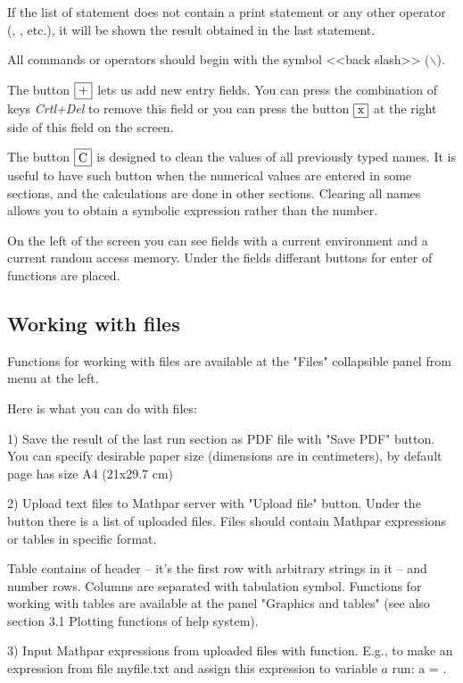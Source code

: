 If the list of statement does not contain a print statement  or any other operator (, , etc.),  it will be shown the result obtained in the last statement.
  
All commands or operators should begin with the symbol <<back slash>> ($\backslash$).  
 
 
The button $\fbox{+}$ lets us add new entry fields. You can press the combination of
 keys {\it Crtl+Del} to remove this field or you can press the button $\fbox{x}$ at the right side of this field on the screen.
 
The button $\fbox{C}$ is designed to clean the values of all previously typed names. 
It is useful to have such button when the numerical values are entered in some sections, and the calculations are done in other sections. 
Clearing all names allows you to obtain a symbolic expression rather than the number.

On the left of the screen you can see fields with a current environment and a current random access memory. Under the fields differant buttons for enter of functions are placed.


\subsection{Working with files}
Functions for working with files are available at the "Files" collapsible panel from menu at the left.

Here is what you can do with files:

1) Save the result of the last run section as PDF file with "Save PDF" button. You can specify desirable
paper size (dimensions are in centimeters), by default page has size A4 (21x29.7 cm)

2) Upload text files to Mathpar server with "Upload file" button. 
Under the button there is a list of uploaded files. 
Files should contain Mathpar expressions or tables in specific format.

Table contains of header -- it's the first row with arbitrary strings in it -- and
number rows. Columns are separated with tabulation symbol. Functions for working 
with tables are available at the panel "Graphics and tables" (see also 
section 3.1 Plotting functions of help system).

3) Input Mathpar expressions from uploaded files with  function.
E.g., to make an expression from file myfile.txt and assign this expression to 
variable $a$ run: a = .

